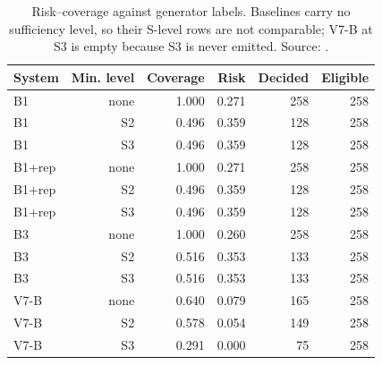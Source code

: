 \begin{table}[t]
\centering\scriptsize
\caption{Risk--coverage against generator labels. Baselines carry no sufficiency level, so their S-level rows are not comparable; V7-B at S3 is empty because S3 is never emitted. Source: .}
\label{tab:riskcov}
\begin{tabular}{lrrrrr}
\hline
System & Min. level & Coverage & Risk & Decided & Eligible \\
\hline
B1 & none & 1.000 & 0.271 & 258 & 258 \\
B1 & S2 & 0.496 & 0.359 & 128 & 258 \\
B1 & S3 & 0.496 & 0.359 & 128 & 258 \\
B1+rep & none & 1.000 & 0.271 & 258 & 258 \\
B1+rep & S2 & 0.496 & 0.359 & 128 & 258 \\
B1+rep & S3 & 0.496 & 0.359 & 128 & 258 \\
B3 & none & 1.000 & 0.260 & 258 & 258 \\
B3 & S2 & 0.516 & 0.353 & 133 & 258 \\
B3 & S3 & 0.516 & 0.353 & 133 & 258 \\
V7-B & none & 0.640 & 0.079 & 165 & 258 \\
V7-B & S2 & 0.578 & 0.054 & 149 & 258 \\
V7-B & S3 & 0.291 & 0.000 & 75 & 258 \\
\hline
\end{tabular}
\end{table}
